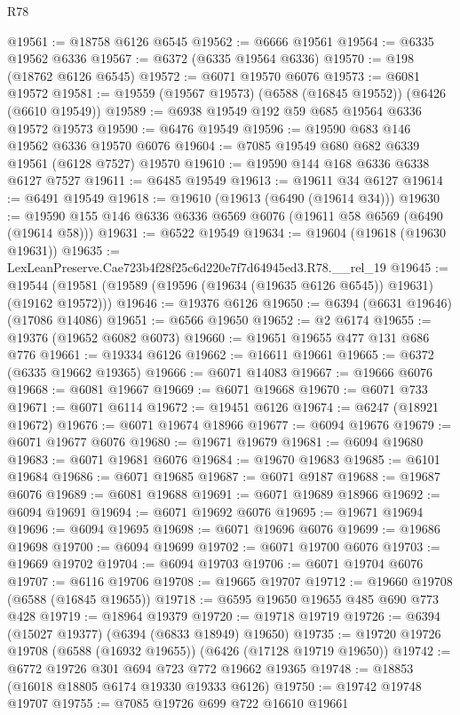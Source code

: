 \begin{lexlean}{R78}
\begin{coremodule}
@19561 := @18758 @6126 @6545
@19562 := @6666 @19561
@19564 := @6335 @19562 @6336
@19567 := @6372 (@6335 @19564 @6336)
@19570 := @198 (@18762 @6126 @6545)
@19572 := @6071 @19570 @6076
@19573 := @6081 @19572
@19581 := @19559 (@19567 @19573) (@6588 (@16845 @19552)) (@6426 (@6610 @19549))
@19589 := @6938 @19549 @192 @59 @685 @19564 @6336 @19572 @19573
@19590 := @6476 @19549
@19596 := @19590 @683 @146 @19562 @6336 @19570 @6076
@19604 := @7085 @19549 @680 @682 @6339 @19561 (@6128 @7527) @19570
@19610 := @19590 @144 @168 @6336 @6338 @6127 @7527
@19611 := @6485 @19549
@19613 := @19611 @34 @6127
@19614 := @6491 @19549
@19618 := @19610 (@19613 (@6490 (@19614 @34)))
@19630 := @19590 @155 @146 @6336 @6336 @6569 @6076 (@19611 @58 @6569 (@6490 (@19614 @58)))
@19631 := @6522 @19549
@19634 := @19604 (@19618 (@19630 @19631))
@19635 := LexLeanPreserve.Cae723b4f28f25c6d220e7f7d64945ed3.R78.__rel_19
@19645 := @19544 (@19581 (@19589 (@19596 (@19634 (@19635 @6126 @6545)) @19631) (@19162 @19572)))
@19646 := @19376 @6126
@19650 := @6394 (@6631 @19646) (@17086 @14086)
@19651 := @6566 @19650
@19652 := @2 @6174
@19655 := @19376 (@19652 @6082 @6073)
@19660 := @19651 @19655 @477 @131 @686 @776
@19661 := @19334 @6126
@19662 := @16611 @19661
@19665 := @6372 (@6335 @19662 @19365)
@19666 := @6071 @14083
@19667 := @19666 @6076
@19668 := @6081 @19667
@19669 := @6071 @19668
@19670 := @6071 @733
@19671 := @6071 @6114
@19672 := @19451 @6126
@19674 := @6247 (@18921 @19672)
@19676 := @6071 @19674 @18966
@19677 := @6094 @19676
@19679 := @6071 @19677 @6076
@19680 := @19671 @19679
@19681 := @6094 @19680
@19683 := @6071 @19681 @6076
@19684 := @19670 @19683
@19685 := @6101 @19684
@19686 := @6071 @19685
@19687 := @6071 @9187
@19688 := @19687 @6076
@19689 := @6081 @19688
@19691 := @6071 @19689 @18966
@19692 := @6094 @19691
@19694 := @6071 @19692 @6076
@19695 := @19671 @19694
@19696 := @6094 @19695
@19698 := @6071 @19696 @6076
@19699 := @19686 @19698
@19700 := @6094 @19699
@19702 := @6071 @19700 @6076
@19703 := @19669 @19702
@19704 := @6094 @19703
@19706 := @6071 @19704 @6076
@19707 := @6116 @19706
@19708 := @19665 @19707
@19712 := @19660 @19708 (@6588 (@16845 @19655))
@19718 := @6595 @19650 @19655 @485 @690 @773 @428
@19719 := @18964 @19379
@19720 := @19718 @19719
@19726 := @6394 (@15027 @19377) (@6394 (@6833 @18949) @19650)
@19735 := @19720 @19726 @19708 (@6588 (@16932 @19655)) (@6426 (@17128 @19719 @19650))
@19742 := @6772 @19726 @301 @694 @723 @772 @19662 @19365
@19748 := @18853 (@16018 @18805 @6174 @19330 @19333 @6126)
@19750 := @19742 @19748 @19707
@19755 := @7085 @19726 @699 @722 @16610 @19661

\end{coremodule}
\end{lexlean}
